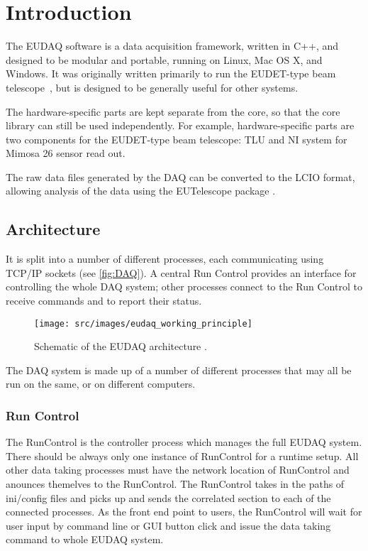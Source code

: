 \section{Introduction}
The EUDAQ software is a data acquisition framework, written in C++,
and designed to be modular and portable, running on Linux, Mac OS X, and Windows.
It was originally written primarily to run the EUDET-type beam telescope~\cite{Roloff:2009zza,Jansen:2016},
but is designed to be generally useful for other systems.

The hardware-specific parts are kept separate from the core,
so that the core library can still be used independently.
For example, hardware-specific parts are two components for the EUDET-type beam telescope: \gls{TLU} and \gls{NI} system for Mimosa 26 sensor read out.

The raw data files generated by the DAQ can be converted to the \gls{LCIO} format,
allowing analysis of the data using the EUTelescope package \cite{eutel2008}.

\subsection{Architecture}
It is split into a number of different processes,
each communicating using TCP/IP sockets (see \autoref{fig:DAQ}).
A central Run Control provides an interface for controlling the whole DAQ system;
other processes connect to the Run Control to receive commands and to report their status.

\begin{figure}[htb]
  \begin{center}
    \texttt{[image: src/images/eudaq\_working\_principle]}
    \caption{Schematic of the EUDAQ architecture \cite{Spannagel:2016}.}
    \label{fig:DAQ}
  \end{center}
\end{figure}


The DAQ system is made up of a number of different processes that may all be run on the same,
or on different computers. 

\subsubsection{Run Control}
The RunControl is the controller process which manages the full EUDAQ system. There should be always only one instance of RunControl for a runtime setup. All other data taking processes must have the network location of RunControl and anounces themelves to the RunControl. The RunControl takes in the paths of ini/config files and picks up and sends the correlated section to each of the connected processes. As the front end point to users, the RunControl will wait for user input by command line or GUI button click and issue the data taking command to whole EUDAQ system.

